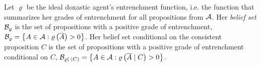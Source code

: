 Let $\varrho$ be the ideal doxastic agent's entrenchment function, i.e. the function that summarizes her grades of entrenchment for all propositions from $\cal A$. Her \emph{belief set} $\begin{cal}B\end{cal}_\varrho$ is the set of propositions with a positive grade of entrenchment, $\begin{cal}B\end{cal}_\varrho=\left\{A\in\begin{cal}A\end{cal}:\varrho\left(\overline{A}\right)>0\right\}$. Her belief set conditional on the consistent proposition $C$ is the set of propositions with a positive grade of entrenchment conditional on $C$, $\begin{cal}B\end{cal}_{\varrho\left(\cdot\mid C\right)}=\left\{A\in\begin{cal}A\end{cal}:\varrho\left(\overline{A}\mid C\right)>0\right\}$. %
